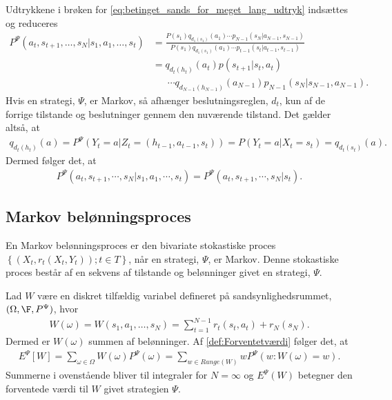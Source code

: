 Udtrykkene i brøken for \eqref{eq:betinget_sands_for_meget_lang_udtryk} indsættes og reduceres
\begin{align*}
P^\Psi(a_t , s_{t+1}, \dots, s_N | s_1 , a_1 , \dots , s_t) &=\frac{P(s_1)q_{d_1(s_1)}(a_1)
    \cdots p_{N-1}(s_N|a_{N-1} , s_{N-1})}{P(s_1)q_{d_1(s_1)}(a_1)
    \cdots p_{t-1}(s_t|a_{t-1} , s_{t-1})}\\
    &= q_{d_t(h_t)}(a_t)p(s_{t+1}|s_t , a_t)\\
    &\phantom{= \ } \cdots q_{d_{N-1}(h_{N-1})}(a_{N-1})p_{N-1}(s_N|s_{N-1} , a_{N-1}).
\end{align*}
Hvis en strategi, $\Psi$, er Markov, så afhænger beslutningsreglen, $d_t$, kun af de forrige tilstande og beslutninger gennem den nuværende tilstand. Det gælder altså, at 
\begin{align*}
    q_{d_t(h_t)}(a)= P^\Psi \left(Y_t = a | Z_t = (h_{t-1} , a_{t-1} , s_t) \right) = P \left(Y_t = a | X_t = s_t\right) = q_{d_t(s_t)}(a).
\end{align*}
Dermed følger det, at
\begin{align*}
    P^{\Psi}\left(a_t , s_{t+1} , \cdots , s_N|s_1 , a_1 , \cdots , s_t\right)=P^{\Psi}\left(a_t , s_{t+1} , \cdots , s_N|s_t\right).
\end{align*}

\subsection{Markov belønningsproces}
En Markov belønningsproces er den bivariate stokastiske proces $\left\{\left(X_t, r_t(X_t, Y_t)\right); t \in T\right\}$, når en strategi, $\Psi$, er Markov. Denne stokastiske proces består af en sekvens af tilstande og belønninger givet en strategi, $\Psi$. 

Lad $W$ være en diskret tilfældig variabel defineret på sandsynlighedsrummet, $(\Omega, \F, P^{\Psi})$, hvor
\begin{align*}
    W(\omega)=W(s_1 , a_1 , \dots , s_N) = \sum_{t=1}^{N-1} r_t(s_t,a_t) + r_N(s_N).
\end{align*}
Dermed er $W(\omega)$ summen af belønninger. Af \autoref{def:Forventetværdi} følger det, at
\begin{align*}
    E^\Psi [W] = \sum_{\omega \in \Omega} W(\omega)P^\Psi\left(\omega\right) = \sum_{w \in Range(W)} w P^\Psi \left(w: W(\omega) = w\right).
\end{align*}
 Summerne i ovenstående bliver til integraler for $N = \infty$ og $E^\Psi(W)$ betegner den forventede værdi til $W$ givet strategien $\Psi$.

